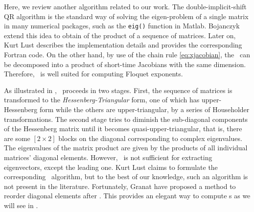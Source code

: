 Here, we review another algorithm related to our work.
The double-implicit-shift QR algorithm
is the standard way
of solving the eigen-problem of a single matrix in many numerical packages,
such as the
\texttt{eig()} function in Matlab.
Bojanczyk \etal{}
extend this
idea to obtain \emph{\psd} of the product of a sequence of matrices. Later on,
Kurt Lust describes the implementation details and provides
the corresponding
Fortran code.
On the other hand, by use of the chain rule \eqref{eq:xjacobian}, the
\JacobianM\ can be decomposed into a product of short-time
Jacobians with the same dimension. Therefore, \psd\ is well suited for computing
Floquet exponents.

As illustrated in , \psd\ proceeds in two stages.
First, the sequence
of matrices is transformed to the \emph{Hessenberg-Triangular} form,
one of which has upper-Hessenberg form while the others
are upper-triangular,
by a series of Householder transformations.
The second stage tries to diminish the sub-diagonal components of
the Hessenberg matrix until it becomes quasi-upper-triangular,
that is, there are some
$[2\!\times\! 2]$ blocks on the diagonal corresponding to
complex eigenvalues. The eigenvalues of the matrix product are
given by the products of all individual matrices' diagonal elements.
However, \psd\ is not sufficient for extracting eigenvectors, except the leading one.
Kurt Lust claims to formulate the corresponding
\Fv\ algorithm, but to
the best of our knowledge, such an algorithm is not present in the literature.
Fortunately, Granat \etal{} have proposed a method to reorder diagonal
elements
after \psd. This provides an elegant way to compute \Fv s as we will see in
.
